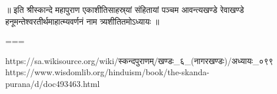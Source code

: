 

॥ इति श्रीस्कान्दे महापुराण एकाशीतिसाहस्र्यां संहितायां पञ्चम आवन्त्यखण्डे रेवाखण्डे हनूमन्तेश्वरतीर्थमाहात्म्यवर्णनं नाम त्र्यशीतितमोऽध्यायः ॥


===

https://sa.wikisource.org/wiki/स्कन्दपुराणम्/खण्डः_६_(नागरखण्डः)/अध्यायः_०९९
https://www.wisdomlib.org/hinduism/book/the-skanda-purana/d/doc493463.html

